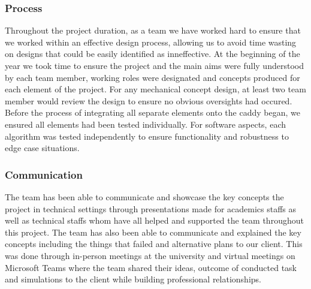 \documentclass[11pt,landscape]{article}
\begin{document}
\begin{multicols}{3}
\subsubsection{Process}
Throughout the project duration, as a team we have worked hard to ensure that we
worked within an effective design process, allowing us to avoid time wasting on
designs that could be easily identified as inneffective. At the beginning of the
year we took time to ensure the project and the main aims were fully understood
by each team member, working roles were designated and concepts produced for
each element of the project. For any mechanical concept design, at least two
team member would review the design to ensure no obvious oversights had occured.
Before the process of integrating all separate elements onto the caddy began, we
ensured all elements had been tested individually. For software aspects, each
algorithm was tested independently to ensure functionality and robustness to
edge case situations. 


\subsubsection{Communication}
The team has been able to communicate and showcase the key concepts the project
in technical settings through presentations made for academics staffs as well as
technical staffs whom have all helped and supported the team throughout this
project. The team has also been able to communicate and explained the key
concepts including the things that failed and alternative plans to our client.
This was done through in-person meetings at the university and virtual meetings
on Microsoft Teams where the team shared their ideas, outcome of conducted task
and simulations to the client while building professional relationships.

\nocite{*}



\end{multicols}
\newpage
\appendix
\end{document}
